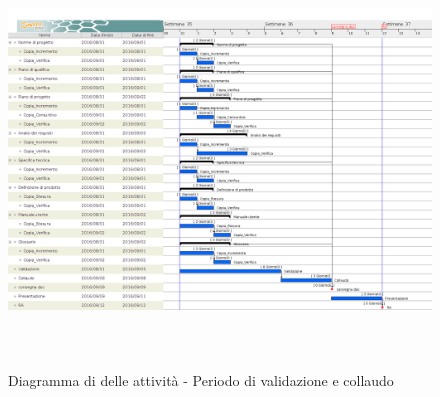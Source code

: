 		\begin{figure}[!h]
			\centering
			\includegraphics[height=11cm, width=15cm]{img/gantt/V} 
			\caption{Diagramma di  delle attività - Periodo di validazione e collaudo}
		\end{figure}
